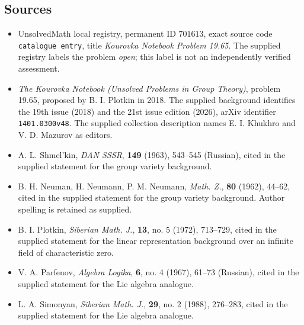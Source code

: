 \documentclass[11pt]{article}
\begin{document}
\subsection{Sources}
\begin{itemize}
\item UnsolvedMath local registry, permanent ID \(701613\), exact source code \texttt{catalogue entry}, title \emph{Kourovka Notebook Problem 19.65}. The supplied registry labels the problem \emph{open}; this label is not an independently verified assessment.
\item \emph{The Kourovka Notebook (Unsolved Problems in Group Theory)}, problem 19.65, proposed by B. I. Plotkin in 2018. The supplied background identifies the 19th issue (2018) and the 21st issue edition (2026), arXiv identifier \texttt{1401.0300v48}. The supplied collection description names E. I. Khukhro and V. D. Mazurov as editors.
\item A. L. Shmel'kin, \emph{DAN SSSR}, \textbf{149} (1963), 543--545 (Russian), cited in the supplied statement for the group variety background.
\item B. H. Neuman, H. Neumann, P. M. Neumann, \emph{Math. Z.}, \textbf{80} (1962), 44--62, cited in the supplied statement for the group variety background. Author spelling is retained as supplied.
\item B. I. Plotkin, \emph{Siberian Math. J.}, \textbf{13}, no. 5 (1972), 713--729, cited in the supplied statement for the linear representation background over an infinite field of characteristic zero.
\item V. A. Parfenov, \emph{Algebra Logika}, \textbf{6}, no. 4 (1967), 61--73 (Russian), cited in the supplied statement for the Lie algebra analogue.
\item L. A. Simonyan, \emph{Siberian Math. J.}, \textbf{29}, no. 2 (1988), 276--283, cited in the supplied statement for the Lie algebra analogue.
\end{itemize}
\end{document}
